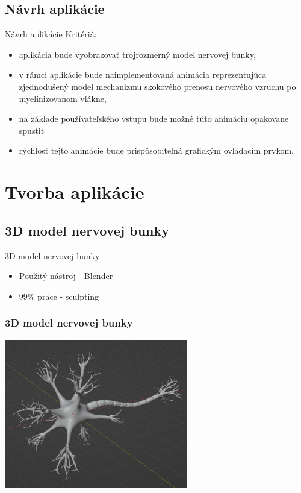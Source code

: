 \documentclass[pdf]{beamer}
\begin{document}
\subsection{Návrh aplikácie}
\begin{frame}{Návrh aplikácie}
    Kritériá:
        \begin{itemize}
        \item aplikácia bude vyobrazovať trojrozmerný model nervovej bunky,
        \item v rámci aplikácie bude naimplementovaná animácia reprezentujúca zjednodušený model mechanizmu skokového prenosu nervového vzruchu po myelinizovanom vlákne,
        \item na základe používateľského vstupu bude možné túto animáciu opakovane spustiť
        \item rýchlosť tejto animácie bude prispôsobiteľná grafickým ovládacím prvkom.
        \end{itemize}
\end{frame}

\section{Tvorba aplikácie}
\subsection{3D model nervovej bunky}
\begin{frame}{3D model nervovej bunky}
    \begin{itemize}
        \item Použitý nástroj - Blender
        \item 99\% práce - sculpting
    \end{itemize}
\end{frame}

\begin{frame}
    \frametitle{3D model nervovej bunky}    
    \begin{center}
        \includegraphics[width=8cm]{../img/finalModel-crop.png}
    \end{center}    
\end{frame}
\end{document}
